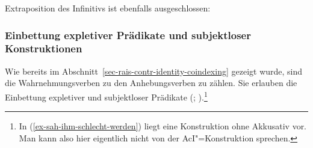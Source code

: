 \noindent
Extraposition des Infinitivs ist ebenfalls ausgeschlossen:
\eal
{}
\zl
{}

\subsubsection{Einbettung expletiver Prädikate und subjektloser Konstruktionen}
\label{sec-aci-expl}

Wie bereits im Abschnitt~\ref{sec-rais-contr-identity-coindexing} gezeigt wurde,
sind die Wahrnehmungsverben zu den Anhebungsverben zu zählen.
Sie erlauben die Einbettung expletiver und subjektloser Prädikate (\citealp[]{Reis76c}; 
\citealp[]{Hoehle78a}).\footnote{
  In (\ref{ex-sah-ihm-schlecht-werden}) liegt eine Konstruktion ohne Akkusativ vor.
  Man kann also hier eigentlich nicht von der AcI"=Konstruktion sprechen.%
}
